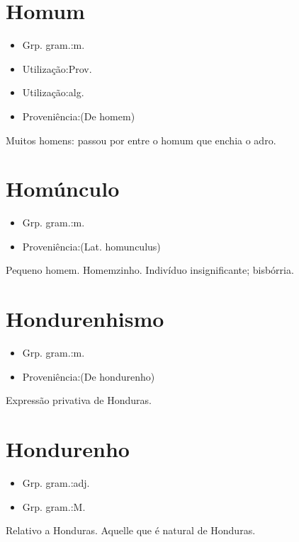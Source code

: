 \documentclass{article}
\begin{document}
\section{Homum}
\begin{itemize}
\item {Grp. gram.:m.}
\end{itemize}
\begin{itemize}
\item {Utilização:Prov.}
\end{itemize}
\begin{itemize}
\item {Utilização:alg.}
\end{itemize}
\begin{itemize}
\item {Proveniência:(De \textunderscore homem\textunderscore )}
\end{itemize}
Muitos homens: \textunderscore passou por entre o homum que enchia o adro\textunderscore .
\section{Homúnculo}
\begin{itemize}
\item {Grp. gram.:m.}
\end{itemize}
\begin{itemize}
\item {Proveniência:(Lat. \textunderscore homunculus\textunderscore )}
\end{itemize}
Pequeno homem.
Homemzinho.
Indivíduo insignificante; bisbórria.
\section{Hondurenhismo}
\begin{itemize}
\item {Grp. gram.:m.}
\end{itemize}
\begin{itemize}
\item {Proveniência:(De \textunderscore hondurenho\textunderscore )}
\end{itemize}
Expressão privativa de Honduras.
\section{Hondurenho}
\begin{itemize}
\item {Grp. gram.:adj.}
\end{itemize}
\begin{itemize}
\item {Grp. gram.:M.}
\end{itemize}
Relativo a Honduras.
Aquelle que é natural de Honduras.
\end{document}
